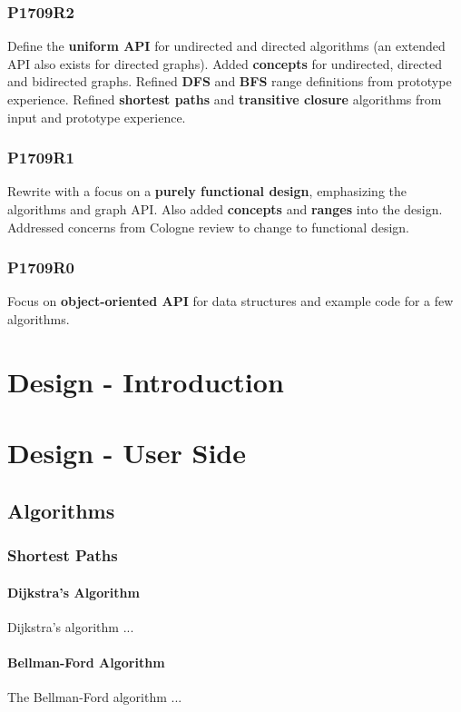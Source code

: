 \documentclass[10pt,onecolumn]{article}
\begin{document}
\subsubsection*{P1709R2}
Define the \textbf{uniform API} for undirected and directed algorithms (an extended API also exists for directed graphs). Added \textbf{concepts} for undirected, directed and bidirected graphs. Refined \textbf{DFS} and \textbf{BFS} range definitions from prototype experience. Refined \textbf{shortest paths} and \textbf{transitive closure} algorithms from input and prototype experience.

\subsubsection*{P1709R1}
Rewrite with a focus on a \textbf{purely functional design}, emphasizing the algorithms and graph API. Also added \textbf{concepts} and \textbf{ranges} into the design. Addressed concerns from Cologne review to change to functional design.

\subsubsection*{P1709R0}
Focus on \textbf{object-oriented API} for data structures and example code for a few algorithms.

\section{Design - Introduction}
\section{Design - User Side}
\subsection{Algorithms}
\subsubsection{Shortest Paths}
\paragraph{Dijkstra's Algorithm}
Dijkstra's algorithm \cite{REF_} ...

\paragraph{Bellman-Ford Algorithm}
The Bellman-Ford algorithm \cite{REF_} ...
\end{document}
